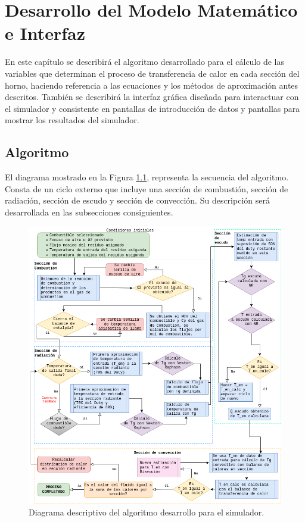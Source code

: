 \chapter{Desarrollo del Modelo Matemático e Interfaz}
\par En este capítulo se describirá el algoritmo desarrollado para el cálculo de las variables que determinan el proceso de transferencia de calor en cada sección del horno, haciendo referencia a las ecuaciones y los métodos de aproximación antes descritos. También se describirá la interfaz gráfica diseñada para interactuar con el simulador y consistente en pantallas de introducción de datos y pantallas para mostrar los resultados del simulador.

\section{Algoritmo}
\par El diagrama mostrado en la Figura \ref{fig:diagrama-algo}, representa la secuencia del algoritmo. Consta de un ciclo externo que incluye una sección de combustión, sección de radiación, sección de escudo y sección de convección. Su descripción será desarrollada en las subsecciones consiguientes.
\begin{figure}[hbt]
\begin{center}
\includegraphics[scale=0.45]{images/diagrama-algo}
\caption[Diagrama de algoritmo]{Diagrama descriptivo del algoritmo desarrollo para el simulador.}
\label{fig:diagrama-algo}
\end{center}
\end{figure}

